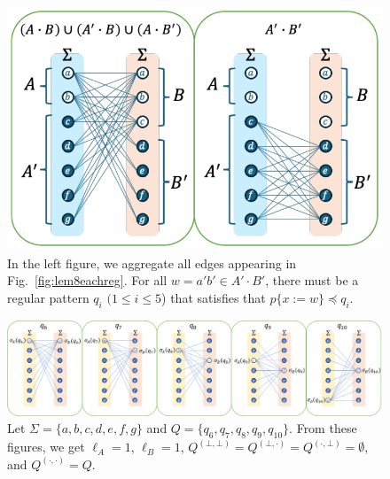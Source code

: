 \begin{figure}[t]
  \begin{center}
    \includegraphics[scale=0.525]{figs/lem8totalreg.pdf}
    \caption{In the left figure, we aggregate all edges appearing in Fig.~\ref{fig:lem8eachreg}. For all $w=a'b'\in A'\cdot B'$, there must be a regular pattern $q_i$ $(1\leq i\leq 5$) that satisfies that $p \{ x:=w \} \preceq q_i$.}\label{fig:lem8totalreg}
  \end{center}
\end{figure}


\begin{figure}[t]
  \begin{center}
    \includegraphics[scale=0.8]{figs/lem8eachreg-suppl.png}
    \caption{Let $\Sigma=\{a,b,c,d,e,f,g\}$ {\color{red} and} $Q=\{q_6,q_7,q_8,q_9,q_{10}\}$. From these figures, we get $\ell_A=1$, $\ell_B=1$, $Q^{(\bot,\bot)}=Q^{(\bot,\cdot)}=Q^{(\cdot,\bot)}=\emptyset$, and $Q^{(\cdot,\cdot)}=Q$.}\label{fig:lem8eachreg-suppl}
  \end{center}
\end{figure}

